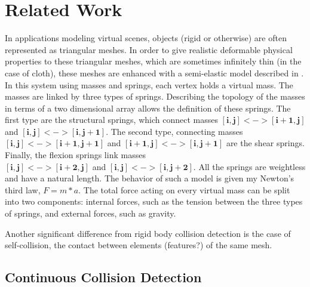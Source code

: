 \chapter{Related Work}
\label{chapter:sota}


In applications modeling virtual scenes, objects (rigid or otherwise) are often represented as triangular meshes. In order to give realistic deformable physical properties to these triangular meshes, which are sometimes infinitely thin (in the case of cloth), these meshes are enhanced with a semi-elastic model described in \cite{provot95}. In this system using masses and springs, each vertex holds a virtual mass. The masses are linked by three types of springs. Describing the topology of the masses in terms of a two dimensional array allows the definition of these springs. The first type are the structural springs, which connect masses $\mathbf{[i, j] <-> [i + 1, j]}$ and $\mathbf{[i, j] <-> [i, j + 1]}$. The second type, connecting masses $\mathbf{[i, j] <-> [i + 1, j + 1]}$ and $\mathbf{[i + 1, j] <-> [i, j + 1]}$ are the shear springs. Finally, the flexion springs link masses\\
 $\mathbf{[i, j] <-> [i + 2, j]}$ and $\mathbf{[i, j] <-> [i, j + 2]}$. All the springs are weightless and have a natural length. The behavior of such a model is given my Newton's third law, $F = m * a$. The total force acting on every virtual mass can be split into two components: internal forces, such as the tension between the three types of springs, and external forces, such as gravity.

Another significant difference from rigid body collision detection is the case of self-collision, the contact between elements (features?) of the same mesh. 



\section{Continuous Collision Detection}
\label{sec:ccd}

